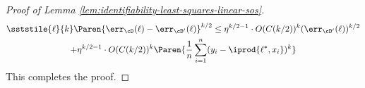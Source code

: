 \begin{proof}[Proof of Lemma \ref{lem:identifiability-least-squares-linear-sos}]
\begin{multline}
\sststile{\ell}{k}  \Paren{\err_{\cD}(\ell) - \err_{\cD'}(\ell)}^{k/2}  \leq \eta^{k/2-1} \cdot O(C(k/2))^{k} (\err_{\cD'}(\ell))^{k/2} \\+ \eta^{k/2-1} \cdot O(C(k/2))^{k} \Paren{ \frac{1}{n} \sum_{i =1}^n (y_i-\iprod{\ell^{*},x_i})^{k}}  
\end{multline}
This completes the proof.










\end{proof}
